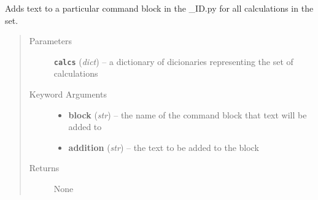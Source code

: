 \documentclass[letterpaper,10pt,english]{sphinxmanual}
\begin{document}
\begin{fulllineitems}
\label{prep:prep.__addToAll}
Adds text to a particular command block in the \_ID.py for all calculations
in the set.
\begin{quote}\begin{description}
\item[{Parameters}] \leavevmode
\textbf{\texttt{calcs}} (\emph{dict}) -- a dictionary of dicionaries representing the set of calculations

\item[{Keyword Arguments}] \leavevmode\begin{itemize}
\item {} 
\textbf{block} (\emph{str}) --
the name of the command block that text will be added to

\item {} 
\textbf{addition} (\emph{str}) --
the text to be added to the block

\end{itemize}

\item[{Returns}] \leavevmode
None

\end{description}\end{quote}

\end{fulllineitems}

\end{document}

